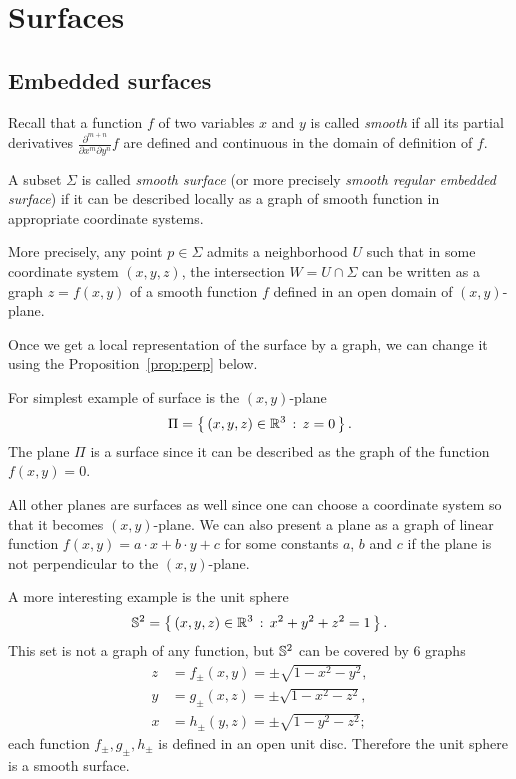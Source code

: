 \chapter{Surfaces}

\section{Embedded surfaces}

Recall that a function $f$ of two variables $x$ and $y$ is called \emph{smooth} if all its partial derivatives $\frac{\partial^{m+n}}{\partial x^m\partial y^n}f$ are defined and continuous in the domain of definition of $f$. 

A subset $\Sigma$ is called \emph{smooth surface} (or more precisely \emph{smooth regular embedded surface}) if it can be described locally as a graph of smooth function in appropriate coordinate systems.

More precisely, any point $p\in \Sigma$ admits a neighborhood $U$ such that
in some coordinate system $(x,y,z)$, 
the intersection $W=U\cap \Sigma$ can be written as a graph $z=f(x,y)$ of a smooth function $f$ defined in an open domain of $(x,y)$-plane.

Once we get a local representation of the surface by a graph, we can change it using the Proposition~\ref{prop:perp} below.

For simplest example of surface is the $(x,y)$-plane 
\[\Pi=\left\{\,{(x,y,z)\in\mathbb{R}^3}\,:\,{z=0}\,\right\}.\]
The plane $\Pi$ is a surface since
it can be described as the graph of the function $f(x,y)=0$.

All other planes are surfaces as well since one can choose a coordinate system so that it becomes $(x,y)$-plane.
We can also present a plane as a graph of linear function 
$f(x,y)=a\cdot x+b\cdot y+c$ for some constants $a$, $b$ and $c$
if the plane is not perpendicular to the $(x,y)$-plane.

A more interesting example is the unit sphere 
\[\mathbb{S}^2=\left\{\,{(x,y,z)\in\mathbb{R}^3}\,:\,{x^2+y^2+z^2=1}\,\right\}.\]
This set is not a graph of any function,
but $\mathbb{S}^2$
can be covered by 6 graphs 
\begin{align*}
z&=f_\pm(x,y)=\pm \sqrt{1-x^2-y^2},
\\
y&=g_\pm(x,z)=\pm \sqrt{1-x^2-z^2},
\\
x&=h_\pm(y,z)=\pm \sqrt{1-y^2-z^2};
\end{align*}
each function $f_\pm,g_\pm,h_\pm$ is defined in an open unit disc.
Therefore the unit sphere is a smooth surface.

